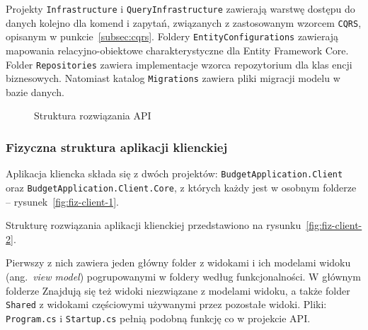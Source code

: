 Projekty \texttt{Infrastructure} i \texttt{QueryInfrastructure} zawierają warstwę dostępu do danych kolejno dla komend i zapytań, związanych z zastosowanym wzorcem \texttt{CQRS}, opisanym w punkcie~\ref{subsec:cqrs}. Foldery \texttt{EntityConfigurations} zawierają mapowania relacyjno-obiektowe charakterystyczne dla Entity Framework Core. Folder \texttt{Repositories} zawiera implementacje wzorca repozytorium dla klas encji biznesowych. Natomiast katalog \texttt{Migrations} zawiera pliki migracji modelu w bazie danych.

\begin{figure}[t]
	\centering
	\caption{Struktura rozwiązania API}
	\label{fig:fiz-api-2}
\end{figure}

\subsubsection{Fizyczna struktura aplikacji klienckiej}

Aplikacja kliencka składa się z dwóch projektów: \texttt{BudgetApplication.Client} oraz \texttt{BudgetApplication.Client.Core}, z których każdy jest w osobnym folderze -- rysunek~\ref{fig:fiz-client-1}. 

Strukturę rozwiązania aplikacji klienckiej przedstawiono na rysunku~\ref{fig:fiz-client-2}.

Pierwszy z nich zawiera jeden główny folder z widokami i ich modelami widoku (ang.~\emph{view model}) pogrupowanymi w foldery według funkcjonalności. W głównym folderze Znajdują się też widoki niezwiązane z modelami widoku, a także folder \texttt{Shared} z widokami częściowymi używanymi przez pozostałe widoki. Pliki: \texttt{Program.cs} i \texttt{Startup.cs} pełnią podobną funkcję co w projekcie API.

